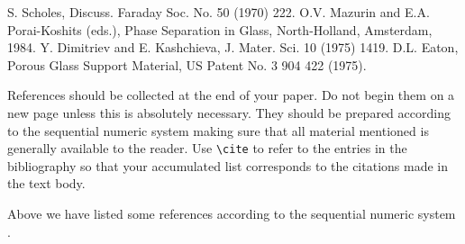 \begin{thebibliography}{9}
 S. Scholes, Discuss. Faraday Soc. No. 50 (1970) 222.
 O.V. Mazurin and E.A. Porai-Koshits (eds.),
                 Phase Separation in Glass, North-Holland, Amsterdam, 1984.
 Y. Dimitriev and E. Kashchieva, 
                 J. Mater. Sci. 10 (1975) 1419.
 D.L. Eaton, Porous Glass Support Material,
                 US Patent No. 3 904 422 (1975).
\end{thebibliography}

References should be collected at the end of your paper. Do not begin
them on a new page unless this is absolutely necessary. They should be
prepared according to the sequential numeric system making sure that
all material mentioned is generally available to the reader. Use
\verb+\cite+ to refer to the entries in the bibliography so that your
accumulated list corresponds to the citations made in the text body. 

Above we have listed some references according to the
sequential numeric system \cite{Scho70,Mazu84,Dimi75,Eato75}.
